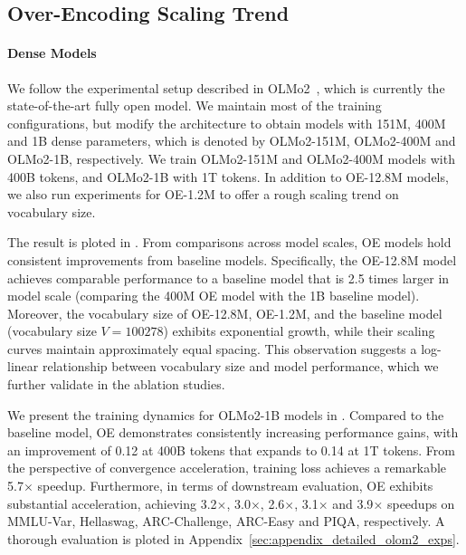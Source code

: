 \subsection{Over-Encoding Scaling Trend}

\paragraph{Dense Models}
We follow the experimental setup described in OLMo2~\cite{olmo20242olmo2furious}, which is currently the state-of-the-art fully open model. We maintain most of the training configurations, but modify the architecture to obtain models with 151M, 400M and 1B dense parameters, which is denoted by OLMo2-151M, OLMo2-400M and OLMo2-1B, respectively. We train OLMo2-151M and OLMo2-400M models with 400B tokens, and OLMo2-1B with 1T tokens. In addition to OE-12.8M models, we also run experiments for OE-1.2M to offer a rough scaling trend on vocabulary size.

The result is ploted in . From comparisons across model scales, OE models hold consistent improvements from baseline models. Specifically, the OE-12.8M model achieves comparable performance to a baseline model that is 2.5 times larger in model scale (comparing the 400M OE model with the 1B baseline model). Moreover, the vocabulary size of OE-12.8M, OE-1.2M, and the baseline model (vocabulary size $V=100278$) exhibits exponential growth, while their scaling curves maintain approximately equal spacing. This observation suggests a log-linear relationship between vocabulary size and model performance, which we further validate in the ablation studies.

We present the training dynamics for OLMo2-1B models in . Compared to the baseline model, OE demonstrates consistently increasing performance gains, with an improvement of 0.12 at 400B tokens that expands to 0.14 at 1T tokens. From the perspective of convergence acceleration, training loss achieves a remarkable 5.7$\times$ speedup. Furthermore, in terms of downstream evaluation, OE exhibits substantial acceleration, achieving 3.2$\times$, 3.0$\times$, 2.6$\times$, 3.1$\times$ and 3.9$\times$ speedups on MMLU-Var, Hellaswag, ARC-Challenge, ARC-Easy and PIQA, respectively. A thorough evaluation is ploted in Appendix~\ref{sec:appendix_detailed_olom2_exps}.



